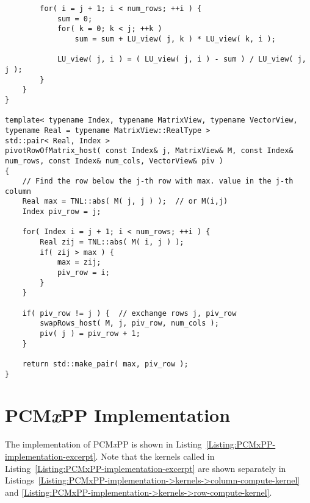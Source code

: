 \begin{lstlisting}
		for( i = j + 1; i < num_rows; ++i ) {
			sum = 0;
			for( k = 0; k < j; ++k )
				sum = sum + LU_view( j, k ) * LU_view( k, i );
			
			LU_view( j, i ) = ( LU_view( j, i ) - sum ) / LU_view( j, j );
		}
	}
}

template< typename Index, typename MatrixView, typename VectorView, typename Real = typename MatrixView::RealType >
std::pair< Real, Index >
pivotRowOfMatrix_host( const Index& j, MatrixView& M, const Index& num_rows, const Index& num_cols, VectorView& piv )
{
	// Find the row below the j-th row with max. value in the j-th column
	Real max = TNL::abs( M( j, j ) );  // or M(i,j)
	Index piv_row = j;
	
	for( Index i = j + 1; i < num_rows; ++i ) {
		Real zij = TNL::abs( M( i, j ) );
		if( zij > max ) {
			max = zij;
			piv_row = i;
		}
	}
	
	if( piv_row != j ) {  // exchange rows j, piv_row
		swapRows_host( M, j, piv_row, num_cols );
		piv( j ) = piv_row + 1;
	}
	
	return std::make_pair( max, piv_row );
}
\end{lstlisting}





\chapter{PCM\textit{x}PP Implementation}\label{Appendix:PCMxPP-implementation}
The implementation of PCM\textit{x}PP is shown in Listing~\ref{Listing:PCMxPP-implementation-excerpt}. Note that the kernels called in Listing~\ref{Listing:PCMxPP-implementation-excerpt} are shown separately in Listings~\ref{Listing:PCMxPP-implementation->kernels->column-compute-kernel} and \ref{Listing:PCMxPP-implementation->kernels->row-compute-kernel}.

